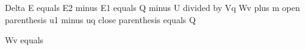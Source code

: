 Delta E equals E2 minus E1 equals Q minus U divided by Vq
Wv plus m open parenthesis u1 minus uq close parenthesis equals Q

Wv equals